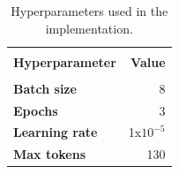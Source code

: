 \begin{table}[H]
    \centering
    \begin{tabular}{lr} \hline
        \\[-0.05cm]
        \textbf{Hyperparameter} & \textbf{Value} \\ \hline
        \\[-0.1cm]
        \textbf{Batch size}     & 8              \\
        \textbf{Epochs}         & 3              \\
        \textbf{Learning rate}  & 1x$10^{-5}$    \\
        \textbf{Max tokens}     & 130            \\ \hline
    \end{tabular}
    \caption{Hyperparameters used in the implementation.}
    \label{table:hyperparameters}
\end{table}